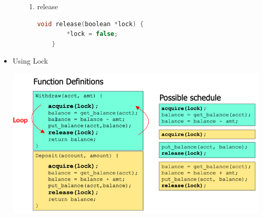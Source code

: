\documentclass[12pt]{article}
\begin{document}
\begin{itemize}
\begin{itemize}
\begin{enumerate}[1.]
            \item release
    \begin{lstlisting}[language=c]
    void release(boolean *lock) {
        *lock = false;
    }
    \end{lstlisting}
        \end{enumerate}
    \end{itemize}
    \item Using Lock

    \begin{center}
    \includegraphics[width=0.8\linewidth]{images/week_2_notes_2_14.png}
    \end{center}
\end{itemize}
\end{document}
